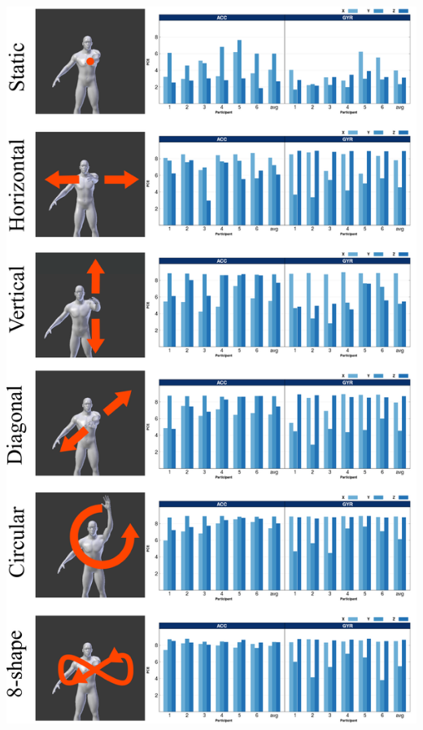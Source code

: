 \documentclass[a0paper,portrait]{baposter}
\begin{document}
\begin{poster}
{\vspace{-1mm}
\begin{center}
\includegraphics[width=1.0\linewidth]{movementsaucs04} 
\end{center}
}
  

\end{poster}
\end{document}
